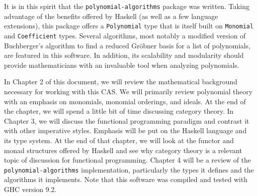 \documentclass[MS, xcolor=dvipsnames]{wfuthesis}
\theoremstyle{definition}
\begin{document}
It is in this spirit that the \lstinline{polynomial-algorithms} package was written. Taking advantage of the benefits offered by Haskell (as well as a few language extensions), this package offers a \lstinline{Polynomial} type that is itself built on \lstinline{Monomial} and \lstinline{Coefficient} types. Several algorithms, most notably a modified version of Buchberger's algorithm to find a reduced Gr\"obner basis for a list of polynomials, are featured in this software. In addition, its scalability and modularity should provide mathematicians with an invaluable tool when analyzing polynomials. \par
In Chapter 2 of this document, we will review the mathematical background necessary for working with this CAS. We will primarily review polynomial theory with an emphasis on monomials, monomial orderings, and ideals. At the end of the chapter, we will spend a little bit of time discussing category theory. In Chapter 3, we will discuss the functional programming paradigm and contrast it with other imperative styles. Emphasis will be put on the Haskell language and its type system. At the end of that chapter, we will look at the functor and monad structures offered by Haskell and see why category theory is a relevant topic of discussion for functional programming. Chapter 4 will be a review of the \lstinline{polynomial-algorithms} implementation, particularly the types it defines and the algorithms it implements. Note that this software was compiled and tested with GHC version 9.2.

\end{document}

